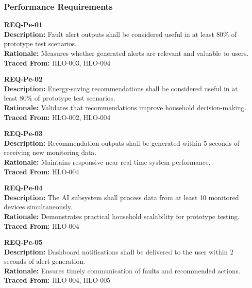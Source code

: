 \documentclass[11pt, twoside, a4paper]{article}
\begin{document}
\vspace{0.5em}

\subsubsection*{Performance Requirements}

\textbf{REQ-Pe-01} \\
\textbf{Description:} Fault alert outputs shall be considered useful in at least 80\% of prototype test scenarios. \\
\textbf{Rationale:} Measures whether generated alerts are relevant and valuable to users. \\
\textbf{Traced From:} HLO-003, HLO-004

\vspace{0.5em}

\textbf{REQ-Pe-02} \\
\textbf{Description:} Energy-saving recommendations shall be considered useful in at least 80\% of prototype test scenarios. \\
\textbf{Rationale:} Validates that recommendations improve household decision-making. \\
\textbf{Traced From:} HLO-002, HLO-004

\vspace{0.5em}

\textbf{REQ-Pe-03} \\
\textbf{Description:} Recommendation outputs shall be generated within 5 seconds of receiving new monitoring data. \\
\textbf{Rationale:} Maintains responsive near real-time system performance. \\
\textbf{Traced From:} HLO-004

\vspace{0.5em}

\textbf{REQ-Pe-04} \\
\textbf{Description:} The AI subsystem shall process data from at least 10 monitored devices simultaneously. \\
\textbf{Rationale:} Demonstrates practical household scalability for prototype testing. \\
\textbf{Traced From:} HLO-004

\vspace{0.5em}

\textbf{REQ-Pe-05} \\
\textbf{Description:} Dashboard notifications shall be delivered to the user within 2 seconds of alert generation. \\
\textbf{Rationale:} Ensures timely communication of faults and recommended actions. \\
\textbf{Traced From:} HLO-004, HLO-005
\end{document}
